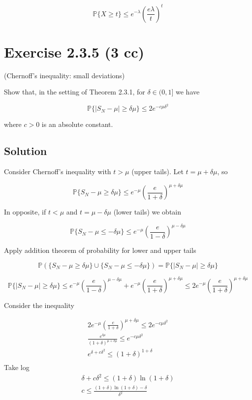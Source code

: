 \documentclass{article}
\begin{document}
$$\mathbb P\{X \geq t\} \leq e^{-\lambda}\left(\frac{e\lambda}{t}\right)^t$$

\section{Exercise 2.3.5 (3 cc)}
(Chernoff’s inequality: small deviations)

Show that, in the setting of Theorem 2.3.1, for $\delta \in (0, 1]$ we have

$$\mathbb P \{|S_N-\mu| \geq \delta\mu\} \leq 2e^{-c\mu\delta^2}$$

where $c > 0$ is an absolute constant.

\subsection{Solution}

Consider Chernoff’s inequality with $t>\mu$ (upper tails). Let $t = \mu+\delta\mu$, so

$$\mathbb P\{S_N - \mu \geq \delta\mu\} \leq e^{-\mu}\left(\frac{e}{1+\delta}\right)^{\mu+\delta\mu}$$

In opposite, if $t<\mu$ and $t = \mu-\delta\mu$ (lower tails) we obtain

$$\mathbb P\{S_N - \mu \leq -\delta\mu\} \leq e^{-\mu}\left(\frac{e}{1-\delta}\right)^{\mu-\delta\mu}$$

Apply addition theorem of probability for lower and upper tails

$$
\mathbb P \left( \{S_N - \mu \geq \delta\mu\} \cup \{S_N - \mu \leq -\delta\mu\}\right) = 
\mathbb P \{ |S_N - \mu|  \geq \delta\mu\}$$

$$\mathbb P \{ |S_N - \mu|  \geq \delta\mu\} \leq e^{-\mu}\left(\frac{e}{1-\delta}\right)^{\mu-\delta\mu} + e^{-\mu}\left(\frac{e}{1+\delta}\right)^{\mu+\delta\mu} \leq 2e^{-\mu}\left(\frac{e}{1+\delta}\right)^{\mu+\delta\mu}$$

Consider the inequality

$$
\begin{gathered}
    2e^{-\mu}\left(\frac{e}{1+\delta}\right)^{\mu+\delta\mu} \leq 2e^{-c\mu\delta^2} \\
    \frac{e^{\delta\mu}}{(1+\delta)^{\mu+\delta\mu}} \leq e^{-c\mu\delta^2} \\
    e^{\delta+c\delta^2} \leq (1+\delta)^{1+\delta} \\
\end{gathered}
$$
Take log
$$
\begin{gathered}
    \delta+c\delta^2 \leq (1+\delta)\ln (1+\delta) \\
    c \leq \frac{(1+\delta)\ln (1+\delta) - \delta}{\delta^2} \\
\end{gathered}
$$
\end{document}
